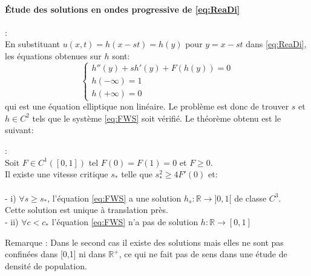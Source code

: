 \paragraph{Étude des solutions en ondes progressive de \eqref{eq:ReaDi}}:\\
En substituant $u(x,t) = h(x-st) = h(y)$ pour $y=x-st$ dans \eqref{eq:ReaDi}, les équations obtenues sur $h$ sont: \begin{equation} \label{eq:FWS} \left\{
                \begin{array}{ll}
                h''(y)+ sh'(y)+F(h(y))=0 \\
                h(-\infty)= 1 \\  h(+\infty) =0 
                   \end{array}
              \right.
\end{equation} 
qui est une équation elliptique non linéaire. Le problème est donc de trouver $s$ et $h \in C^2$ tels que le système \eqref{eq:FWS} soit vérifié. Le théorème obtenu est le suivant:



\begin{theorem}:\\
Soit $F \in C^1([0,1])$ tel $F(0)=F(1)=0$ et $F\geq 0$. \\
Il existe une vitesse critique $s_*$ telle que $s_*^2 \geq 4F'(0)$ et: \\ \\
- i) $\forall s \geq s_*$, l'équation \eqref{eq:FWS} a une solution $h_s:\mathbb{R} \rightarrow ]0,1[$ de classe $C^3$.\\ Cette solution est unique à translation près. \\
- ii)  $\forall c<c_*$ l'équation \eqref{eq:FWS} n'a pas de solution $h:\mathbb{R} \rightarrow [0,1]$
\end{theorem}
Remarque : Dans le second cas il existe des solutions mais elles ne sont pas confinées dans [0,1] ni dans $\mathbb{R}^+$, ce qui ne fait pas de sens dans une étude de densité de population.

\newpage
